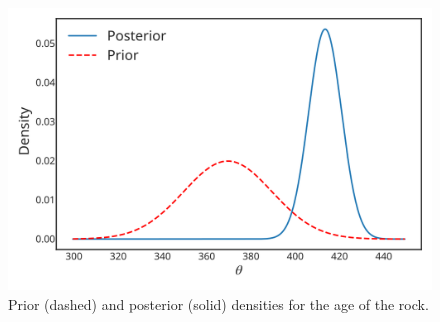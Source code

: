 {\begin{figure}[ht]
\includegraphics{images/priorposterior4.svg}
\caption{Prior (dashed) and posterior (solid) densities for the age of the rock.}
\label{fig:normalplot}

\end{figure}}








































































